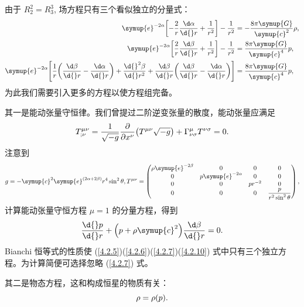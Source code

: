 \documentclass[UTF8, 12pt, a4paper, oneside, onecolumn, fontset=none]{ctexart}
\begin{document}
由于 $R^{2}_{2}=R^{3}_{3}$, 场方程只有三个看似独立的分量式：
\begin{align}
\symup{e}^{-2\alpha}\mleft[-\frac{2}{r}\frac{\d\alpha}{\d{}r}+\frac{1}{r^{2}}\mright]-\frac{1}{r^{2}}&=-\frac{8\pi\symup{G}}{\symup{c}^{2}}\rho,\label{4.2.5}\\
\symup{e}^{-2\alpha}\mleft[\frac{2}{r}\frac{\d\beta}{\d{}r}+\frac{1}{r^{2}}\mright]-\frac{1}{r^{2}}&=\frac{8\pi\symup{G}}{\symup{c}^{4}}p,\label{4.2.6}\\
\symup{e}^{-2\alpha}\mleft[\frac{1}{r}\mleft(\frac{\d\beta}{\d{}r}-\frac{\d\alpha}{\d{}r}\mright)+\frac{\d{}^{2}\beta}{\d{}r^{2}}+\frac{\d\beta}{\d{}r}\mleft(\frac{\d\beta}{\d{}r}-\frac{\d\alpha}{\d{}r}\mright)\mright]&=\frac{8\pi\symup{G}}{\symup{c}^{4}}p,\label{4.2.7}
\end{align}
为此我们需要引入更多的方程以使方程组完备。

其一是能动张量守恒律。我们曾提过二阶逆变张量的散度，能动张量应满足
\begin{equation}
T^{\mu\nu}_{;\nu}=\frac{1}{\sqrt{-g}}\frac{\partial{}}{\partial{}x^{\nu}}\mleft(T^{\mu\nu}\sqrt{-g}\mright)+\Gamma^{\mu}_{\nu\sigma}T^{\nu\sigma}=0.
\end{equation}
注意到
\begin{equation}
g=-\symup{c}^{2}\symup{e}^{\mleft(2\alpha+2\beta\mright)}r^{4}\sin^{2}{\theta}, T^{\mu\nu}=
\begin{pmatrix}
\rho \symup{e}^{-2\beta} & 0 & 0 & 0\\
0 & p\symup{e}^{-2\alpha} & 0 & 0\\
0 & 0 & pr^{-2} & 0\\
0 & 0 & 0 & \dfrac{p}{r^{2}\sin^{2}{\theta}}\\
\end{pmatrix},
\end{equation}
计算能动张量守恒方程 $\mu=1$ 的分量方程，得到
\begin{equation}
\frac{\d{}p}{\d{}r}+\mleft(p+\rho \symup{c}^{2}\mright)\frac{\d\beta}{\d{}r}=0.\label{4.2.10}
\end{equation}
Bianchi 恒等式的性质使 (\ref{4.2.5})(\ref{4.2.6})(\ref{4.2.7})(\ref{4.2.10}) 式中只有三个独立方程。为计算简便可选择忽略 (\ref{4.2.7}) 式。

其二是物态方程，这和构成恒星的物质有关：
\begin{equation}
\rho=\rho\mleft(p\mright).
\end{equation}
\end{document}
